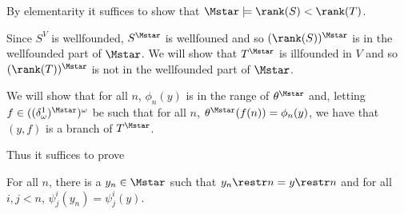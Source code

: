 \documentclass[oneside,12pt]{amsart}
\begin{document}
By elementarity it suffices to show that $\Mstar \models \rank(S) < \rank(T)$.

Since $S^V$ is wellfounded, $S^{\Mstar}$ is wellfouned and so $(\rank(S))^{\Mstar}$ is in the
wellfounded part of $\Mstar$. We will show that $T^{\Mstar}$
is illfounded in $V$ and so $(\rank(T))^{\Mstar}$ is not in the wellfounded part of $\Mstar$.

We will show that for all $n$, $\phi_n(y)$ is in the range of $\theta^{\Mstar}$ and,
letting $f\in ((\delta^1_\omega)^{\Mstar})^{\omega}$ be such that for all $n$,
$\theta^{\Mstar}(f(n)) = \phi_n(y)$, we have that $(y,f)$ is a branch of $T^{\Mstar}$.

Thus it suffices to prove

\begin{lemma}
For all $n$, there is a $y_n\in \Mstar$ such that $y_n\restr n = y \restr n$ and
for all $i,j < n$, $\psi^i_j(y_n) = \psi^i_j(y)$.
\end{lemma}
\end{document}

